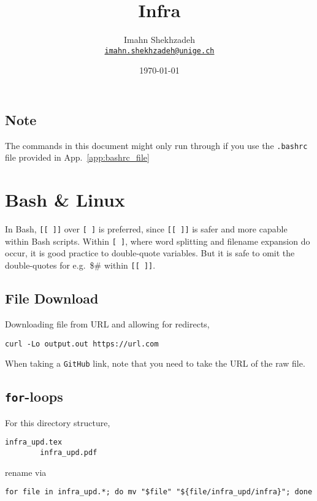 \documentclass[12pt, a4paper]{scrbook}
\title{Infra}
\author{Imahn Shekhzadeh \\ \texttt{\href{mailto:email@example.com}{imahn.shekhzadeh@unige.ch}}\normalsize}
\date{\today}
\numberwithin{equation}{section}
\theoremstyle{definition}
\theoremstyle{definition}
\begin{document}
	\maketitle 
	\tableofcontents
	
	\section*{\large Note}
	
	The commands in this document might only run through if you use the \texttt{.bashrc} file provided in App.~\ref{app:bashrc_file}	
	
	\chapter{Bash \& Linux}
	
	In Bash, \texttt{[[ ]]} over \texttt{[ ]} is preferred, since \texttt{[[ ]]} is safer and more capable within Bash scripts. 
	Within \texttt{[ ]}, where word splitting and filename expansion do occur, it is good practice to double-quote variables. 
	But it is safe to omit the double-quotes for e.g.~\$\# within \texttt{[[ ]]}.
	
	\section{File Download}	

	Downloading file from URL and allowing for redirects, 
	
	\begin{lstlisting}[style=mystylebash, label=alg:curl, xleftmargin=\parindent]
		curl -Lo output.out https://url.com
	\end{lstlisting}
	
	When taking a \texttt{GitHub} link, note that you need to take the URL of the raw file.

	\section{\texttt{for}-loops}
	
	For this directory structure, 
	
	\begin{lstlisting}[style=mystylebash, label=alg:exmp__dir_struc, xleftmargin=\parindent]
		infra_upd.tex
		infra_upd.pdf
	\end{lstlisting} 
	
	rename via
	
	\begin{lstlisting}[style=mystylebash, label=alg:linux_mv_files_for, xleftmargin=\parindent]
		for file in infra_upd.*; do mv "$file" "${file/infra_upd/infra}"; done
	\end{lstlisting}
	
\end{document}

